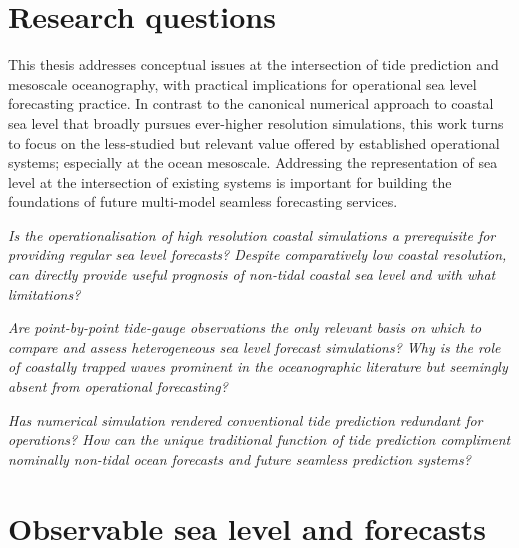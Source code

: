 \section{Research questions}
This thesis addresses conceptual issues at the intersection of tide prediction and mesoscale oceanography, with practical implications for operational sea level forecasting practice. 
In contrast to the canonical numerical approach to coastal sea level that broadly pursues  ever-higher resolution simulations, this work turns to focus on the less-studied but relevant value offered by established operational systems; especially at the ocean mesoscale. Addressing the representation of sea level at the intersection of existing systems is important for building the foundations of future multi-model seamless forecasting services.


\emph{%
Is the operationalisation of high resolution coastal simulations a prerequisite for providing regular sea level forecasts?  Despite comparatively low coastal resolution, can \BL{} directly provide useful prognosis of non-tidal coastal sea level and with what limitations? }



\emph{Are point-by-point tide-gauge observations the only relevant basis on which to compare and assess heterogeneous sea level forecast simulations? 
Why is the role of coastally trapped waves prominent in the oceanographic literature but seemingly absent from operational forecasting?}



\emph{Has numerical simulation rendered conventional tide prediction redundant for operations?  How can the unique traditional function of tide prediction compliment nominally non-tidal ocean forecasts and future seamless prediction systems? 
}


\section{Observable sea level and forecasts}

